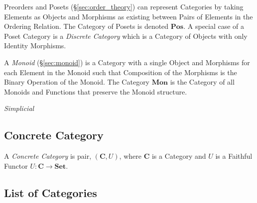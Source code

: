 Preorders and Posets (\S\ref{sec:order_theory}) can represent
Categories by taking Elements as Objects and Morphisms as existing
between Pairs of Elements in the Ordering Relation. The Category of
Posets is denoted $\mathbf{Pos}$. A special case of a Poset Category
is a \emph{Discrete Category} which is a Category of Objects with only
Identity Morphisms.

A \emph{Monoid} (\S\ref{sec:monoid}) is a Category with a single
Object and Morphisms for each Element in the Monoid such that
Composition of the Morphisms is the Binary Operation of the
Monoid. The Category $\mathbf{Mon}$ is the Category of all Monoids and
Functions that preserve the Monoid structure.

\emph{Simplicial}



\subsection{Concrete Category}\label{sec:concrete_category}

A \emph{Concrete Category} is pair, $(\mathbf{C},U)$, where
$\mathbf{C}$ is a Category and $U$ is a Faithful Functor $U :
\mathbf{C} \rightarrow \mathbf{Set}$.



\subsection{List of Categories}\label{sec:categories_list}

